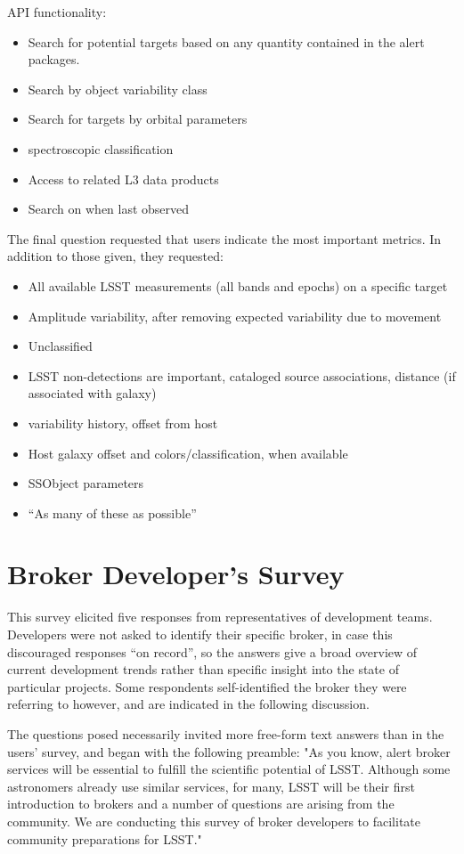 \documentclass{article}
\begin{document}
\noindent API functionality:
\begin{itemize}
\item Search for potential targets based on any quantity contained in the alert packages.
\item Search by object variability class
\item Search for targets by orbital parameters
\item spectroscopic classification
\item Access to related L3 data products
\item Search on when last observed
\end{itemize}

The final question requested that users indicate the most important metrics.  In addition to those given, they requested:

\begin{itemize}
\item All available LSST measurements (all bands and epochs) on a specific target
\item Amplitude variability, after removing expected variability due to movement
\item Unclassified
\item LSST non-detections are important, cataloged source associations, distance (if associated with galaxy)
\item variability history, offset from host
\item Host galaxy offset and colors/classification, when available
\item SSObject parameters
\item ``As many of these as possible''
\end{itemize}

\section{Broker Developer's Survey}

This survey elicited five responses from representatives of development teams.  Developers were not asked to identify their specific broker, in case this discouraged responses ``on record'', so the answers give a broad overview of current development trends rather than specific insight into the state of particular projects.  Some respondents self-identified the broker they were referring to however, and are indicated in the following discussion.  

The questions posed necessarily invited more free-form text answers than in the users' survey, and began with the following preamble:
"As you know, alert broker services will be essential to fulfill the scientific potential of LSST.  Although some astronomers already use similar services, for many, LSST will be their first introduction to brokers and a number of questions are arising from the community.  We are conducting this survey of broker developers to facilitate community preparations for LSST."
\end{document}
